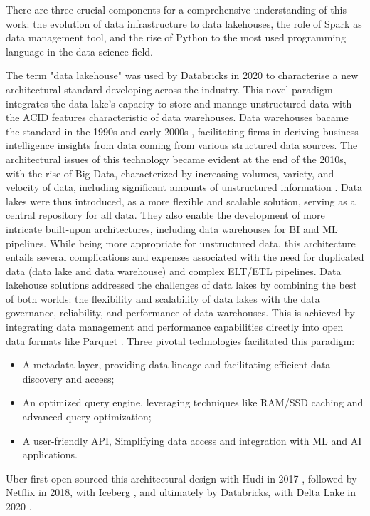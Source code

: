 There are three crucial components for a comprehensive understanding of this work: the evolution of data infrastructure to data lakehouses, the role of Spark as data management tool, and the rise of Python to the most used programming language in the data science field.

\smallskip

The term "data lakehouse" was used by Databricks in 2020 \cite{WhatLakehouse2020} to characterise a new architectural standard developing across the industry. This novel paradigm integrates the data lake's capacity to store and manage unstructured data with the \gls{ACID} features characteristic of data warehouses.
Data warehouses bacame the standard in the 1990s and early 2000s \cite{chaudhuriOverviewDataWarehousing1997}, facilitating firms in deriving business intelligence insights from data coming from various structured data sources. The architectural issues of this technology became evident at the end of the 2010s, with the rise of Big Data, characterized by increasing volumes, variety, and velocity of data, including significant amounts of unstructured information \cite{ederUnstructuredData802008}. 
Data lakes were thus introduced, as a more flexible and scalable solution, serving as a central repository for all data. They also enable the development of more intricate built-upon architectures, including data warehouses for \gls{BI} and \gls{ML} pipelines. While being more appropriate for unstructured data, this architecture entails several complications and expenses associated with the need for duplicated data (data lake and data warehouse) and complex \gls{ELT}/\gls{ETL} pipelines.
Data lakehouse solutions addressed the challenges of data lakes  by combining the best of both worlds: the flexibility and scalability of data lakes with the data governance, reliability, and performance of data warehouses. This is achieved by integrating data management and performance capabilities directly into open data formats like Parquet \cite{DremelMadeSimple}. Three pivotal technologies facilitated this paradigm:
\begin{itemize}
    \item A metadata layer, providing data lineage and facilitating efficient data discovery and access;
    \item An optimized query engine, leveraging techniques like \gls{RAM}/\gls{SSD} caching and advanced query optimization;
    \item A user-friendly API, Simplifying data access and integration with \gls{ML} and \gls{AI} applications.
\end{itemize}
Uber first open-sourced this architectural design with Hudi in 2017 \cite{rajaperumalUberEngineeringIncremental2017}, followed by Netflix in 2018, with Iceberg \cite{IcebergExamples2024}, and ultimately by Databricks, with Delta Lake in 2020 \cite{armbrustDeltaLakeHighperformance2020}.

